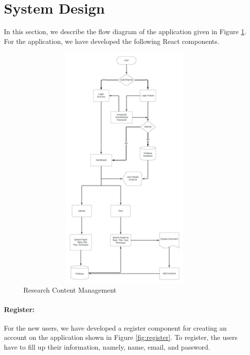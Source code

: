 \section{System Design} In this section, we describe the flow diagram of the application given in Figure \ref{fig:design}. For the application, we have developed the following React components.
\begin{figure}[htp]
	\centering
	\includegraphics[width=11cm,height=12.5cm]{./images/flow.jpg}
	\caption{Research Content Management}
	\label{fig:design}
\end{figure}
\paragraph{\textbf{Register:}} For the new users, we 
have developed a register component for creating an account on the application shown in Figure \ref{fig:register}. To register, the users have to fill up their information, namely, name, email, and password. 

